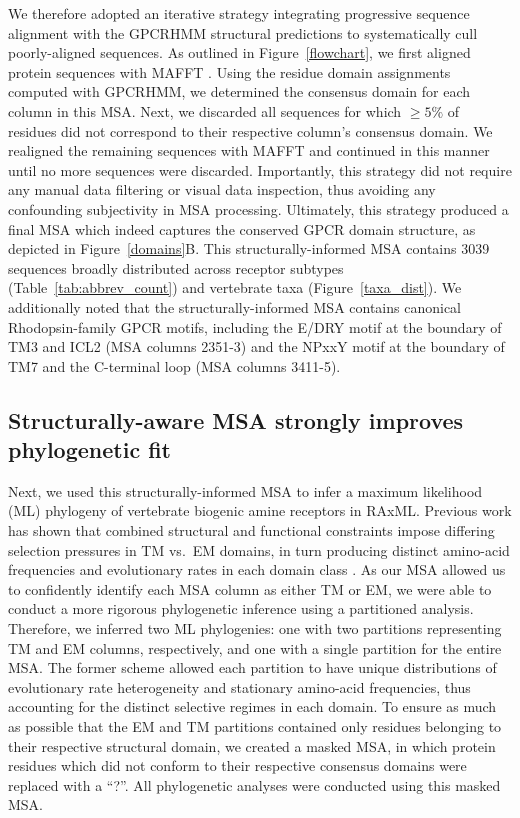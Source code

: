 \documentclass[fleqn,10pt]{wlpeerj}
\begin{document}
We therefore adopted an iterative strategy integrating progressive sequence alignment with the GPCRHMM structural predictions to systematically cull poorly-aligned sequences. As outlined in Figure~\ref{flowchart}, we first aligned protein sequences with MAFFT \citep{mafftv7}. Using the residue domain assignments computed with GPCRHMM, we determined the consensus domain for each column in this MSA. Next, we discarded all sequences for which $\geq 5\%$ of residues did not correspond to their respective column's consensus domain. We realigned the remaining sequences with MAFFT and continued in this manner until no more sequences were discarded. Importantly, this strategy did not require any manual data filtering or visual data inspection, thus avoiding any confounding subjectivity in MSA processing. Ultimately, this strategy produced a final MSA which indeed captures the conserved GPCR domain structure, as depicted in Figure~\ref{domains}B. This structurally-informed MSA contains 3039 sequences broadly distributed across receptor subtypes (Table~\ref{tab:abbrev_count}) and vertebrate taxa (Figure~\ref{taxa_dist}). We additionally noted that the structurally-informed MSA contains canonical Rhodopsin-family GPCR motifs, including the E/DRY motif at the boundary of TM3 and ICL2 (MSA columns 2351-3) and the NPxxY motif at the boundary of TM7 and the C-terminal loop (MSA columns 3411-5).



\subsection*{Structurally-aware MSA strongly improves phylogenetic fit}

Next, we used this structurally-informed MSA to infer a maximum likelihood (ML) phylogeny of vertebrate biogenic amine receptors in RAxML. Previous work has shown that combined structural and functional constraints impose differing selection pressures in TM vs.\ EM domains, in turn producing distinct amino-acid frequencies and evolutionary rates in each domain class \citep{Tourasse2000,Stevens2001,Julenius2006,Oberai2009,SpielmanWilke2013,FranzosaXueXia2013}. As our MSA allowed us to confidently identify each MSA column as either TM or EM, we were able to conduct a more rigorous phylogenetic inference using a partitioned analysis. Therefore, we inferred two ML phylogenies: one with two partitions representing TM and EM columns, respectively, and one with a single partition for the entire MSA. The former scheme allowed each partition to have unique distributions of evolutionary rate heterogeneity and stationary amino-acid frequencies, thus accounting for the distinct selective regimes in each domain. To ensure as much as possible that the EM and TM partitions contained only residues belonging to their respective structural domain, we created a masked MSA, in which protein residues which did not conform to their respective consensus domains were replaced with a ``?''. All phylogenetic analyses were conducted using this masked MSA.
\end{document}
